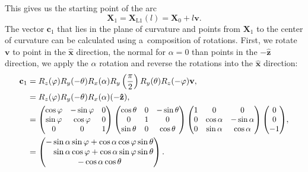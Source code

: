 			This gives us the starting point of the arc
				\begin{equation}
					\mathbf{X}_1 = \mathbf{X}_\text{L1}(l) = \mathbf{X}_0 + l\mathbf{v}.
				\end{equation}
			The vector $\mathbf{c}_1$ that lies in the plane of curvature and points from $\mathbf{X}_1$ to the center of curvature can be calculated using a~composition of rotations. First, we rotate $\mathbf{v}$ to point in the $\mathbf{\hat{x}}$ direction, the normal for $\alpha = 0$ than points in the $-\mathbf{\hat{z}}$ direction, we apply the $\alpha$ rotation and reverse the rotations into the $\mathbf{\hat{x}}$ direction:
				\begin{equation}
					\begin{aligned}
						\mathbf{c}_1 &= R_z(\varphi)R_y(-\theta)R_x(\alpha)R_y\left(\frac{\pi}{2}\right)R_y(\theta)R_z(-\varphi)\mathbf{v},\\
						&= R_z(\varphi)R_y(-\theta)R_x(\alpha)(-\mathbf{\hat{z}}),\\
						&= \scalebox{0.95}{$
								\begin{pmatrix}
									\cos\varphi & -\sin\varphi & 0\\
									\sin\varphi & \cos\varphi & 0\\
									0 & 0 & 1
								\end{pmatrix}
								\begin{pmatrix}
									\cos\theta & 0 & -\sin\theta\\
									0 & 1 & 0\\
									\sin\theta & 0 & \cos\theta
								\end{pmatrix}
								\begin{pmatrix}
									1 & 0 & 0\\
									0 & \cos\alpha & -\sin\alpha\\
									0 & \sin\alpha & \cos\alpha
								\end{pmatrix}
								\begin{pmatrix}
									0\\ 0\\ -1
								\end{pmatrix}
							$},\\
						&= 	\begin{pmatrix}
								-\sin\alpha\sin\varphi+\cos\alpha\cos\varphi\sin\theta\\
								\phantom{-}\sin\alpha\cos\varphi+\cos\alpha\sin\varphi\sin\theta\\
								-\cos\alpha\cos\theta
							\end{pmatrix}.
					\end{aligned}
				\end{equation}
